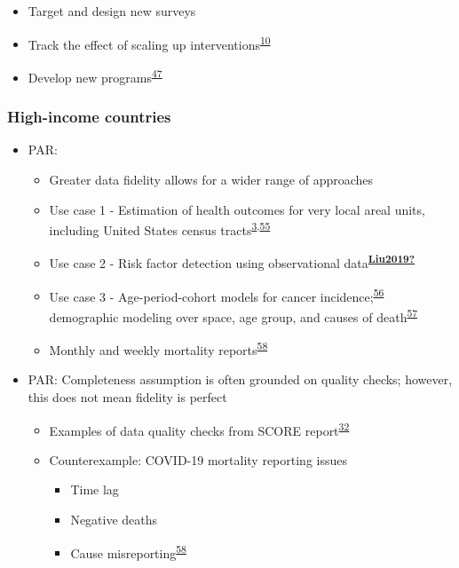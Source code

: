 \documentclass[
]{article}
\providecommand{\tightlist}{%
  \setlength{\itemsep}{0pt}\setlength{\parskip}{0pt}}
\begin{document}
\begin{itemize}
  \begin{itemize}
  \tightlist
  \item
    Target and design new surveys
  \item
    Track the effect of scaling up interventions\textsuperscript{\protect\hyperlink{ref-Diggle2016}{10}}
  \item
    Develop new programs\textsuperscript{\protect\hyperlink{ref-Pigott2015}{47}}
  \end{itemize}
\end{itemize}

\hypertarget{high-income-countries}{%
\subsubsection{High-income countries}\label{high-income-countries}}

\begin{itemize}
\tightlist
\item
  PAR:

  \begin{itemize}
  \tightlist
  \item
    Greater data fidelity allows for a wider range of approaches
  \item
    Use case 1 - Estimation of health outcomes for very local areal units, including United States census tracts\textsuperscript{\protect\hyperlink{ref-Dwyer-Lindgren2017}{3},\protect\hyperlink{ref-Zhang2014}{55}}
  \item
    Use case 2 - Risk factor detection using observational data\textsuperscript{\protect\hyperlink{ref-Liu2019}{\textbf{Liu2019?}}}
  \item
    Use case 3 - Age-period-cohort models for cancer incidence;\textsuperscript{\protect\hyperlink{ref-Papoila2014}{56}} demographic modeling over space, age group, and causes of death\textsuperscript{\protect\hyperlink{ref-Dwyer-Lindgren2016}{57}}
  \item
    Monthly and weekly mortality reports\textsuperscript{\protect\hyperlink{ref-Weinberger2020a}{58}}
  \end{itemize}
\item
  PAR: Completeness assumption is often grounded on quality checks; however, this does not
  mean fidelity is perfect

  \begin{itemize}
  \tightlist
  \item
    Examples of data quality checks from SCORE report\textsuperscript{\protect\hyperlink{ref-WorldHealthOrganization2021}{32}}
  \item
    Counterexample: COVID-19 mortality reporting issues

    \begin{itemize}
    \tightlist
    \item
      Time lag
    \item
      Negative deaths
    \item
      Cause misreporting\textsuperscript{\protect\hyperlink{ref-Weinberger2020a}{58}}
    \end{itemize}
  \end{itemize}
\end{itemize}
\end{document}
